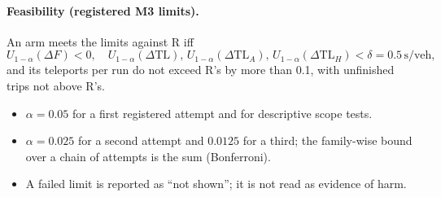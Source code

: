 \documentclass[11pt]{article}
\begin{document}
\paragraph{Feasibility (registered M3 limits).} An arm meets the limits against R iff
\begin{equation}
U_{1-\alpha}(\Delta F)<0,\quad U_{1-\alpha}(\Delta\mathrm{TL}),\,U_{1-\alpha}(\Delta\mathrm{TL}_A),\,U_{1-\alpha}(\Delta\mathrm{TL}_H)<\delta=0.5\,\mathrm{s/veh},
\end{equation}
and its teleports per run do not exceed R's by more than 0.1, with unfinished trips not above R's.
\begin{itemize}\setlength\itemsep{0pt}
\item $\alpha=0.05$ for a first registered attempt and for descriptive scope tests.
\item $\alpha=0.025$ for a second attempt and $0.0125$ for a third; the family-wise bound over a chain of attempts is the sum (Bonferroni).
\item A failed limit is reported as ``not shown''; it is not read as evidence of harm.
\end{itemize}
\end{document}
